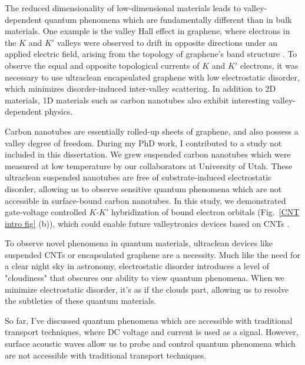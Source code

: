 \documentclass[double,12pt,1in,seploa]{beavtex}
\begin{document}
The reduced dimensionality of low-dimensional materials leads to valley-dependent quantum phenomena which are fundamentally different than in bulk materials. One example is the valley Hall effect in graphene, where electrons in the $K$ and $K'$ valleys were observed to drift in opposite directions under an applied electric field, arising from the topology of graphene's band structure \cite{gorbachev_detecting_2014}. To observe the equal and opposite topological currents of $K$ and $K'$ electrons, it was necessary to use ultraclean encapsulated graphene with low electrostatic disorder, which minimizes disorder-induced inter-valley scattering. In addition to 2D materials, 1D materials such as carbon nanotubes also exhibit interesting valley-dependent physics. 

Carbon nanotubes are essentially rolled-up sheets of graphene, and also possess a valley degree of freedom. During my PhD work, I contributed to a study not included in this dissertation. We grew suspended carbon nanotubes which were measured at low temperature by our collaborators at University of Utah. These ultraclean suspended nanotubes are free of substrate-induced electrostatic disorder, allowing us to observe sensitive quantum phenomena which are not accessible in surface-bound carbon nanotubes. In this study, we demonstrated gate-voltage controlled $K$-$K'$ hybridization of bound electron orbitals (Fig.\ \ref{CNT intro fig} (b)), which could enable future valleytronics devices based on CNTs \cite{berg_vernier_2024}. 

To observe novel phenomena in quantum materials, ultraclean devices like suspended CNTs or encapsulated graphene are a necessity. Much like the need for a clear night sky in astronomy, electrostatic disorder introduces a level of "cloudiness" that obscures our ability to view quantum phenomena. When we minimize electrostatic disorder, it’s as if the clouds part, allowing us to resolve the subtleties of these quantum materials. 

So far, I've discussed quantum phenomena which are accessible with traditional transport techniques, where DC voltage and current is used as a signal. However, surface acoustic waves allow us to probe and control quantum phenomena which are not accessible with traditional transport techniques. 
\end{document}
